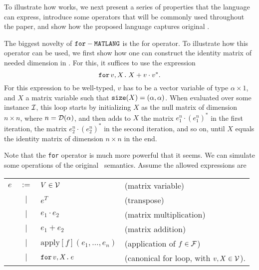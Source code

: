 To illustrate how \langfor works, we next present a series of properties that the language can express, introduce some operators that will be commonly used throughout the paper, and show how the proposed language captures original \lang.

\medskip

The biggest novelty of $\texttt{for}-\texttt{MATLANG}$ is the for operator. To illustrate how this operator can be used, we first show how one can construct the identity matrix of needed dimension in \langfor. For this, it suffices to use the expression $$\texttt{for}\, v,X \texttt{.}\, X + v\cdot v^*.$$ For this expression to be well-typed, $v$ has to be a vector variable of type $\alpha\times 1$, and $X$ a matrix variable such that $\texttt{size}(X) = (\alpha,\alpha)$. When evaluated over some instance $\mathcal{I}$, this loop starts by initializing $X$ as the null matrix of dimension $n\times n$, where $n=\mathcal{D}(\alpha)$, and then adds to $X$ the matrix $e_1^n\cdot (e_1^n)^*$ in the first iteration, the matrix $e_2^n\cdot (e_2^n)^*$ in the second iteration, and so on, until $X$ equals the identity matrix of dimension $n\times n$ in the end.


\medskip

Note that the  \texttt{for} operator is much more powerful that it seems. We can simulate some operations of the original \lang\ semantics. Assume the allowed expressions are

\begin{tabular}{lcll}
$e$ & $:=$ & $V\in \mathcal{V}$ & (matrix variable)\\
 & $|$ & $e^T$ & (transpose)\\ 
 & $|$ & $e_1 \cdot e_2$ & (matrix multiplication)\\   
 & $|$ & $e_1 + e_2$ & (matrix addition)\\    
 & $|$ & $\text{apply}[f](e_1,\ldots ,e_n)$ & (application of $f\in \mathcal{F}$)\\
 & $|$ & $\texttt{for}\, v,X \texttt{.}\, e$ & (canonical for loop, with $v, X \in \mathcal{V}$). 
\end{tabular}

